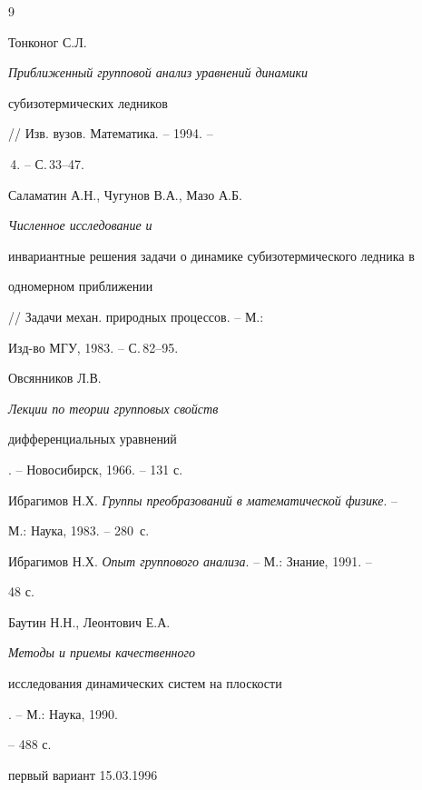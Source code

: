\begin{thebibliography}{9} 


 




Тонконог С.Л. {\em Приближенный групповой анализ уравнений динамики 


субизотермических ледников} // Изв. вузов. Математика. -- 1994. -- 


\No\,4. -- С.\,33--47. 




Саламатин А.Н., Чугунов В.А., Мазо А.Б. {\em Численное исследование и 


инвариантные решения задачи о динамике субизотермического ледника в 


одномерном приближении} // Задачи механ. природных процессов. -- М.: 


Изд-во МГУ, 1983. -- С.\,82--95. 




Овсянников Л.В. {\em Лекции по теории групповых свойств 


дифференциальных уравнений}. -- Новосибирск, 1966. -- 131 с. 




Ибрагимов Н.Х. {\em Группы преобразований в математической физике}. -- 


М.: Наука, 1983. -- 280~с. 




Ибрагимов Н.Х. {\em Опыт группового анализа}. -- М.: Знание, 1991. -- 


48 с. 




Баутин Н.Н., Леонтович Е.А. {\em Методы и приемы качественного 


исследования динамических систем на плоскости}. -- М.: Наука, 1990. 


-- 488 с. 


 


 


\end{thebibliography} 


 


\vskip 2cm 


 






 


\label{end} 


 








первый вариант 15.03.1996 \tts{!!!!!} 